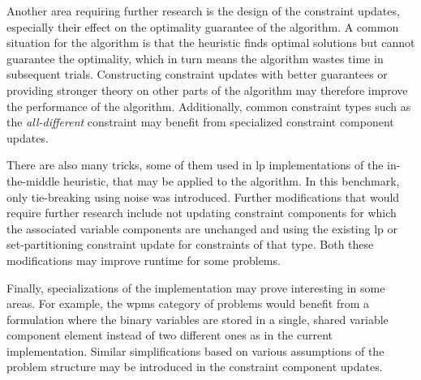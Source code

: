 Another area requiring further research is the design of the constraint updates, especially their effect on the optimality guarantee of the algorithm.
A common situation for the algorithm is that the heuristic finds optimal solutions but cannot guarantee the optimality, which in turn means the algorithm wastes time in subsequent trials.
Constructing constraint updates with better guarantees or providing stronger theory on other parts of the algorithm may therefore improve the performance of the algorithm.
Additionally, common constraint types such as the \emph{all-different} constraint may benefit from specialized constraint component updates.

There are also many tricks, some of them used in \gls{lp} implementations of the in-the-middle heuristic, that may be applied to the algorithm.
In this benchmark, only tie-breaking using noise was introduced.
Further modifications that would require further research include not updating constraint components for which the associated variable components are unchanged and using the existing \gls{lp} or set-partitioning constraint update \parencite[\pno~102]{Wedelin08} for constraints of that type.
Both these modifications may improve runtime for some problems.

Finally, specializations of the implementation may prove interesting in some areas.
For example, the \gls{wpms} category of problems would benefit from a formulation where the binary variables are stored in a single, shared variable component element instead of two different ones as in the current implementation.
Similar simplifications based on various assumptions of the problem structure may be introduced in the constraint component updates.
